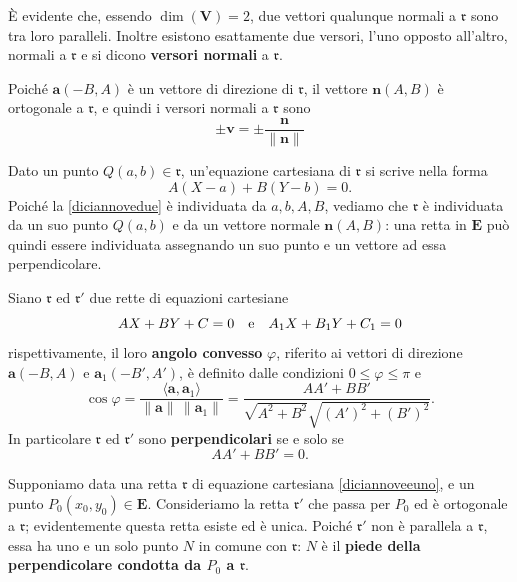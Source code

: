 \documentclass{article}
\theoremstyle{plain}
\theoremstyle{definition}
\theoremstyle{remark}
\begin{document}
\vspace{10pt}

È evidente che, essendo $\dim(\mathbf{V}) = 2$, due vettori qualunque normali a $\mathfrak{r}$ sono tra loro 
paralleli. Inoltre esistono esattamente due versori, l'uno opposto all'altro, normali a $\mathfrak{r}$ 
e si dicono \textbf{versori normali} a $\mathfrak{r}$.

\vspace{10pt}

Poiché $\mathbf{a}(-B, A)$ è un vettore di direzione di $\mathfrak{r}$, il vettore $\mathbf{n}(A, B)$ è ortogonale 
a $\mathfrak{r}$, e quindi i versori normali a $\mathfrak{r}$ sono
\[\pm \mathbf{v} = \pm \frac{\mathbf{n}}{\|\mathbf{n}\|}\]

\vspace{10pt}

Dato un punto $Q(a,b)\in\mathfrak{r}$, un'equazione cartesiana di $\mathfrak{r}$ si scrive nella forma
\begin{equation}\label{diciannovedue}
A(X - a) + B(Y - b) = 0.    
\end{equation}
Poiché la \ref{diciannovedue} è individuata da $a, b, A, B$, vediamo che $\mathfrak{r}$ è individuata da 
un suo punto $Q(a,b)$ e da un vettore normale $\mathbf{n}(A,B)$: una retta in $\mathbf{E}$ può quindi 
essere individuata assegnando un suo punto e un vettore ad essa perpendicolare.

\vspace{10pt}

Siano $\mathfrak{r}$ ed $\mathfrak{r}'$ due rette di equazioni cartesiane
\[
A X + B Y + C = 0 \quad \textup{e}\quad A_1 X + B_1 Y + C_1 = 0 
\]
rispettivamente, il loro \textbf{angolo convesso} $\varphi$, riferito ai vettori di direzione 
$\mathbf{a}(-B, A)$ e $\mathbf{a}_1(-B', A')$, è definito dalle condizioni $0 \leq \varphi \leq \pi$ e
\[
\cos \varphi = \frac{\langle \mathbf{a}, \mathbf{a}_1 \rangle}{\|\mathbf{a}\|\, \|\mathbf{a}_1\|} 
= \frac{AA' + BB'}{\sqrt{A^2 + B^2} \sqrt{(A')^2 + (B')^2}}.
\]
In particolare $\mathfrak{r}$ ed $\mathfrak{r}'$ sono \textbf{perpendicolari} se e solo se
\[
AA' + BB' = 0.
\]

\vspace{10pt}

Supponiamo data una retta $\mathfrak{r}$ di equazione cartesiana \ref{diciannoveeuno}, e un punto 
$P_0(x_0, y_0) \in \mathbf{E}$. Consideriamo la retta $\mathfrak{r}'$ che passa per $P_0$ ed è ortogonale a $\mathfrak{r}$;
evidentemente questa retta esiste ed è unica. Poiché $\mathfrak{r}'$ non è parallela a $\mathfrak{r}$, essa ha
uno e un solo punto $N$ in comune con $\mathfrak{r}$: $N$ è il \textbf{piede della perpendicolare condotta da $P_0$ a $\mathfrak{r}$}.
\end{document}
